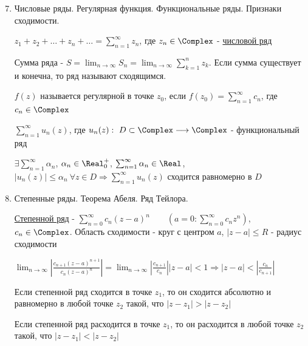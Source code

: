\documentclass[12pt]{article}
\begin{document}
\begin{enumerate}
    \setcounter{enumi}{6}

    \item Числовые ряды. Регулярная функция. Функциональные ряды. Признаки сходимости.

     $z_1 + z_2 + \dots + z_n + \dots = \sum_{n = 1}^\infty z_n$, где $z_n \in \Complex$ - \hyperlink{complex_series}{числовой ряд}

     Сумма ряда - $S = \lim_{n \to \infty} S_n = \lim_{n \to \infty} \sum_{k = 1}^n z_k$. Если сумма существует и конечна, то ряд называют сходящимся. 

    \Defs $f(z)$ называется регулярной в точке $z_0$, если $f(z_0) = \sum_{n = 1}^\infty c_n$, где $c_n \in \Complex$

    \Defs $\sum_{n = 1}^\infty u_n(z)$, где $u_n(z) : \ D \subset \Complex \longrightarrow \Complex$ - функциональный ряд

    \begin{MyTheorem}
    
        $\exists \sum_{n = 1}^\infty \alpha_n$, $\alpha_n \in \Real_0^+$, $\sum_{n = 1}^\infty \alpha_n \in \Real$,
        $|u_n(z)| \leq \alpha_n \ \forall z \in D \Longrightarrow \sum_{n = 1}^\infty u_n(z)$ сходится равномерно в $D$
    \end{MyTheorem}

    \item Степенные ряды. Теорема Абеля. Ряд Тейлора.

    \Defs \hyperlink{complex_power_series}{Степенной ряд} - $\sum_{n = 0}^\infty c_n (z - a)^n \qquad \left(a = 0: \sum_{n = 0}^\infty c_n z^n\right)$, $c_n \in \Complex$. Область сходимости - круг с центром $a$, $|z - a| \leq R$ - радиус сходимости 

    $\lim_{n \to \infty} \left|\frac{c_{n + 1} (z - a)^{n + 1}}{c_n (z - a)^n}\right| = \lim_{n \to \infty} \left|\frac{c_{n + 1}}{c_n}\right| |z - a| < 1 \Longrightarrow |z - a| < \left|\frac{c_n}{c_{n + 1}}\right|$

    \begin{MyTheorem}
        
        Если степенной ряд сходится в точке $z_1$, то он сходится абсолютно и равномерно 
        в любой точке $z_2$ такой, что $|z - z_1| > |z - z_2|$

        Если степенной ряд расходится в точке $z_1$, то он расходится
        в любой точке $z_2$ такой, что $|z - z_1| < |z - z_2|$
    \end{MyTheorem}


\end{enumerate}
\end{document}
